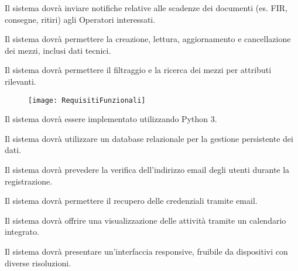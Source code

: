 \documentclass[a4paper]{report}
\begin{document}
Il sistema dovrà inviare notifiche relative alle scadenze dei documenti (es. FIR, consegne, ritiri) agli Operatori interessati.



Il sistema dovrà permettere la creazione, lettura, aggiornamento e cancellazione dei mezzi, inclusi dati tecnici.


Il sistema dovrà permettere il filtraggio e la ricerca dei mezzi per attributi rilevanti.

\begin{figure}[H]
    \centering
    \texttt{[image: RequisitiFunzionali]}
\end{figure}
\clearpage





Il sistema dovrà essere implementato utilizzando Python 3.


Il sistema dovrà utilizzare un database relazionale per la gestione persistente dei dati.


Il sistema dovrà prevedere la verifica dell'indirizzo email degli utenti durante la registrazione.


Il sistema dovrà permettere il recupero delle credenziali tramite email.



Il sistema dovrà offrire una visualizzazione delle attività tramite un calendario integrato.


Il sistema dovrà presentare un'interfaccia responsive, fruibile da dispositivi con diverse risoluzioni.

\end{document}
